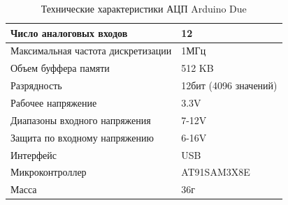 \documentclass[../paper.tex]{subfiles}
\begin{document}
\begin{table}[H]
\centering
\caption{Технические характеристики АЦП Arduino Due}

\begin{tabular}{|l|l|}
                                                                      \hline
Число аналоговых входов            & 12                            \\ \hline
Максимальная частота дискретизации & 1МГц                          \\ \hline
Объем буффера памяти               & 512 KB					               \\ \hline
Разрядность                        & 12бит (4096 значений)         \\ \hline
Рабочее напряжение                 & 3.3V                          \\ \hline
Диапазоны входного напряжения      & 7-12V                         \\ \hline
Защита по входному напряжению      & 6-16V                         \\ \hline
Интерфейс                          & USB                           \\ \hline
Микроконтроллер                    & AT91SAM3X8E                   \\ \hline
Масса                              & 36г                           \\ \hline
\end{tabular}
\end{table}
\end{document}
